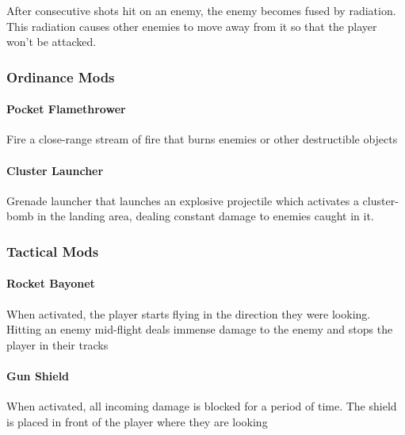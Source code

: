 \documentclass[../Main.tex]{subfiles}
\begin{document}
After consecutive shots hit on an enemy, the enemy becomes fused by radiation. This radiation causes other enemies to move away from it so that the player won't be attacked.

\subsubsection{Ordinance Mods}

\paragraph{Pocket Flamethrower} 

Fire a close-range stream of fire that burns enemies or other destructible objects

\paragraph{Cluster Launcher}

Grenade launcher that launches an explosive projectile which activates a cluster-bomb in the landing area, dealing constant damage to enemies caught in it.

\subsubsection{Tactical Mods}

\paragraph{Rocket Bayonet}

When activated, the player starts flying in the direction they were looking. Hitting an enemy mid-flight deals immense damage to the enemy and stops the player in their tracks

\paragraph{Gun Shield}

When activated, all incoming damage is blocked for a period of time. The shield is placed in front of the player where they are looking
\end{document}
